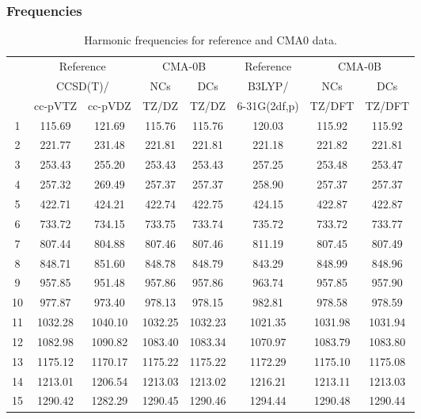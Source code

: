 \documentclass[10pt,oneside]{article}
\begin{document}
\subsubsection*{Frequencies}
\begin{table}[h!]
\centering
\caption{Harmonic frequencies for reference and CMA0 data.}
\begin{tabular}{cccccccc}
\toprule
{} & \multicolumn{2}{c}{Reference} & \multicolumn{2}{c}{CMA-0B} &    Reference & \multicolumn{2}{c}{CMA-0B} \\
{} & \multicolumn{2}{c}{CCSD(T)/} &     NCs &     DCs &       B3LYP/ &     NCs &     DCs \\
{} &   cc-pVTZ & cc-pVDZ &   TZ/DZ &   TZ/DZ & 6-31G(2df,p) &  TZ/DFT &  TZ/DFT \\
\midrule
1  &    115.69 &  121.69 &  115.76 &  115.76 &       120.03 &  115.92 &  115.92 \\
2  &    221.77 &  231.48 &  221.81 &  221.81 &       221.18 &  221.82 &  221.81 \\
3  &    253.43 &  255.20 &  253.43 &  253.43 &       257.25 &  253.48 &  253.47 \\
4  &    257.32 &  269.49 &  257.37 &  257.37 &       258.90 &  257.37 &  257.37 \\
5  &    422.71 &  424.21 &  422.74 &  422.75 &       424.15 &  422.87 &  422.87 \\
6  &    733.72 &  734.15 &  733.75 &  733.74 &       735.72 &  733.72 &  733.77 \\
7  &    807.44 &  804.88 &  807.46 &  807.46 &       811.19 &  807.45 &  807.49 \\
8  &    848.71 &  851.60 &  848.78 &  848.79 &       843.29 &  848.99 &  848.96 \\
9  &    957.85 &  951.48 &  957.86 &  957.86 &       963.74 &  957.85 &  957.90 \\
10 &    977.87 &  973.40 &  978.13 &  978.15 &       982.81 &  978.58 &  978.59 \\
11 &   1032.28 & 1040.10 & 1032.25 & 1032.23 &      1021.35 & 1031.98 & 1031.94 \\
12 &   1082.98 & 1090.82 & 1083.40 & 1083.34 &      1070.97 & 1083.79 & 1083.80 \\
13 &   1175.12 & 1170.17 & 1175.22 & 1175.22 &      1172.29 & 1175.10 & 1175.08 \\
14 &   1213.01 & 1206.54 & 1213.03 & 1213.02 &      1216.21 & 1213.11 & 1213.03 \\
15 &   1290.42 & 1282.29 & 1290.45 & 1290.46 &      1294.44 & 1290.48 & 1290.44 \\

\end{tabular}
\end{table}
\end{document}
